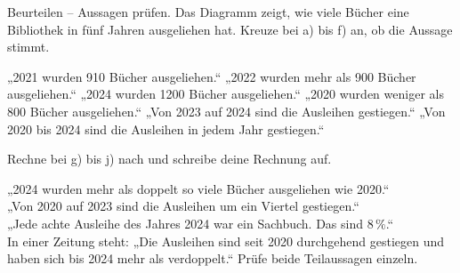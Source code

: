 \setcounter{aufgabe}{35}

\begin{aufgabe}{Beurteilen -- Aussagen prüfen. Das Diagramm zeigt, wie viele Bücher eine Bibliothek in fünf Jahren ausgeliehen hat. Kreuze bei a) bis f) an, ob die Aussage stimmt.}
\noindent{}

\begin{teile}
\teil „2021 wurden 910 Bücher ausgeliehen.“ \hfill \janein
\teil „2022 wurden mehr als 900 Bücher ausgeliehen.“ \hfill \janein
\teil „2024 wurden 1200 Bücher ausgeliehen.“ \hfill \janein
\teil „2020 wurden weniger als 800 Bücher ausgeliehen.“ \hfill \janein
\teil „Von 2023 auf 2024 sind die Ausleihen gestiegen.“ \hfill \janein
\teil „Von 2020 bis 2024 sind die Ausleihen in jedem Jahr gestiegen.“ \hfill \janein
\end{teile}

Rechne bei g) bis j) nach und schreibe deine Rechnung auf.
\begin{teile}
\teil „2024 wurden mehr als doppelt so viele Bücher ausgeliehen wie 2020.“ \\[10pt]
\teil „Von 2020 auf 2023 sind die Ausleihen um ein Viertel gestiegen.“ \\[10pt]
\teil „Jede achte Ausleihe des Jahres 2024 war ein Sachbuch. Das sind $8\,\%$.“ \\[10pt]
\teil In einer Zeitung steht: „Die Ausleihen sind seit 2020 durchgehend gestiegen und haben sich bis 2024 mehr als verdoppelt.“ Prüfe beide Teilaussagen einzeln. \\[14pt]
\end{teile}
\end{aufgabe}

